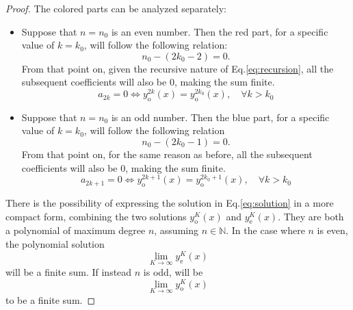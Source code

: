 \begin{proof}
    The colored parts can be analyzed separately:
    \begin{itemize}
      \item[\textcolor{red}{\textbullet}] Suppose that $n=n_0$ is an even number. Then the red part, for a specific value of $k=k_0$, will follow the following relation:
    \begin{equation*}
    n_0-(2k_0-2)=0. 
    \end{equation*}
    From that point on, given the recursive nature of Eq.\eqref{eq:recursion}, all the subsequent coefficients will also be 0, making the sum finite.
    \begin{equation*}
    a_{2k}=0 \iff y_{\text{o}}^{2k}(x)=y_{\text{o}}^{2k_0}(x), \quad \forall k>k_0
    \end{equation*} 
      \item[\textcolor{blue}{\textbullet}] Suppose that $n=n_0$ is an odd number. Then the blue part, for a specific value of $k=k_0$, will follow the following relation 
    \begin{equation*}
    n_0-(2k_0-1)=0.  
    \end{equation*}
    From that point on, for the same reason as before, all the subsequent coefficients will also be 0, making the sum finite.
    \begin{equation*}
    a_{2k+1}=0 \iff y_{\text{o}}^{2k+1}(x)=y_{\text{o}}^{2k_0+1}(x), \quad \forall k>k_0
    \end{equation*}
    \end{itemize} 
    
    There is the possibility of expressing the solution in Eq.\eqref{eq:solution} in a more compact form, combining the two solutions $y_\text{o}^K(x)$ and $y_\text{e}^K(x)$. They are both a polynomial of maximum degree $n$, assuming $n \in \mathbb{N}$. In the case where $n$ is even, the polynomial solution
    \begin{equation*}
    \lim_{K\to \infty} y_\text{e}^K(x)
    \end{equation*}
    will be a finite sum. If instead $n$ is odd, will be 
    \begin{equation*}
    \lim_{K\to \infty} y_\text{o}^K(x)
    \end{equation*}
    to be a finite sum. 
    

\end{proof}
